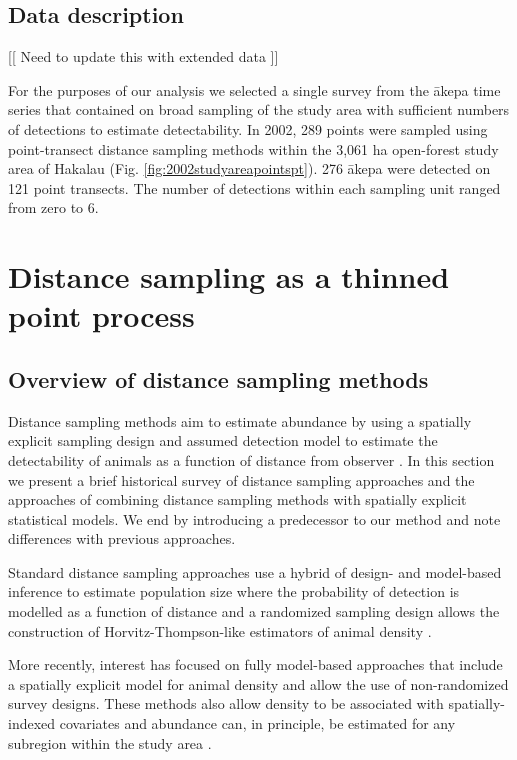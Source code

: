 \documentclass[preprint,12pt]{elsarticle}
\newcommand{\akepa}{\textquotesingle\={a}kepa}  %
\begin{document}
\subsection{Data description}
[[ Need to update this with extended data ]]

For the purposes of our analysis we selected a single survey from the \akepa{} time series that contained on broad sampling of the study area with sufficient numbers of detections to estimate detectability. In 2002, 289 points were sampled using point-transect distance sampling methods within the 3,061 ha open-forest study area of Hakalau (Fig. \ref{fig:2002studyareapointspt}). 276 \akepa{} were detected on 121 point transects. The number of detections within each sampling unit ranged from zero to 6. 


\section{Distance sampling as a thinned point process}

\subsection{Overview of distance sampling methods}

Distance sampling methods aim to estimate abundance by using a spatially explicit sampling design and assumed detection model to estimate the detectability of animals as a function of distance from observer \citep{buckland_advanced_2004, buckland_distance_2015}. In this section we present a brief historical survey of distance sampling approaches and the approaches of combining distance sampling methods with spatially explicit statistical models.  We end by introducing a predecessor to our method and note differences with previous approaches. 

Standard distance sampling approaches use a hybrid of design- and model-based inference to estimate population size where the probability of detection is modelled as a function of distance and a randomized sampling design allows the construction of Horvitz-Thompson-like estimators of animal density \citep{horvitz_generalization_1952,  buckland_advanced_2004}.

More recently, interest has focused on fully model-based approaches that include a spatially explicit model for animal density and allow the use of non-randomized survey designs.  These methods also allow density to be associated with spatially-indexed covariates and abundance can, in principle, be estimated for any subregion within the study area \citep{johnson_model-based_2010, miller_spatial_2013, buckland_model-based_2016}.  
\end{document}
